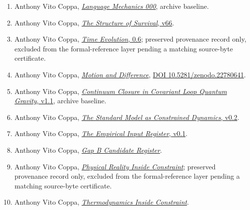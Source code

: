\begin{enumerate}
\def\labelenumi{\arabic{enumi}.}
\tightlist
\item
  Anthony Vito Coppa, \href{https://github.com/Coppalini-Architecture/coppalini-architecture/blob/9b7122ca5c3712c2c294e2bc5097276d0ba9817b/papers/language-mechanics/000-language-mechanics/language-mechanics-000-v0.2.1.pdf}{\emph{Language Mechanics 000}}, archive baseline.
\item
  Anthony Vito Coppa, \href{https://doi.org/10.5281/zenodo.23697265}{\emph{The Structure of Survival}, v66}.
\item
  Anthony Vito Coppa, \href{https://eulershiddenl.ink/papers/time_evolution_0_6.pdf}{\emph{Time Evolution}, 0.6}; preserved provenance record only, excluded from the formal-reference layer pending a matching source-byte certificate.
\item
  Anthony Vito Coppa, \href{https://github.com/Coppalini-Architecture/coppalini-architecture/blob/9b7122ca5c3712c2c294e2bc5097276d0ba9817b/papers/motion-and-difference/motion-and-difference-2026-07-17.pdf}{\emph{Motion and Difference}}, \href{https://doi.org/10.5281/zenodo.22780641}{DOI 10.5281/zenodo.22780641}.
\item
  Anthony Vito Coppa, \href{https://github.com/Coppalini-Architecture/coppalini-architecture/blob/9b7122ca5c3712c2c294e2bc5097276d0ba9817b/papers/continuum-closure-covariant-lqg/continuum-closure-covariant-lqg-v1.1.pdf}{\emph{Continuum Closure in Covariant Loop Quantum Gravity}, v1.1}, archive baseline.
\item
  Anthony Vito Coppa, \href{https://chatgpt.com/library?file_id=libfile_5aa28715b83881919460603dea30bc25\&account_id=personal}{\emph{The Standard Model as Constrained Dynamics}, v0.2}.
\item
  Anthony Vito Coppa, \href{https://chatgpt.com/library?file_id=libfile_843edf27b3e88191b692d66ea6f0de03\&account_id=personal}{\emph{The Empirical Input Register}, v0.1}.
\item
  Anthony Vito Coppa, \href{https://chatgpt.com/library?file_id=libfile_67018da506648191b88970078f33fd1a\&account_id=personal}{\emph{Gap B Candidate Register}}.
\item
  Anthony Vito Coppa, \href{https://eulershiddenl.ink/papers/physical-reality-inside-constraint.pdf}{\emph{Physical Reality Inside Constraint}}; preserved provenance record only, excluded from the formal-reference layer pending a matching source-byte certificate.
\item
  Anthony Vito Coppa, \href{https://chatgpt.com/library?file_id=libfile_37ba8f1902d88191a1ecc5aa2a9514dd\&account_id=personal}{\emph{Thermodynamics Inside Constraint}}.

\end{enumerate}
